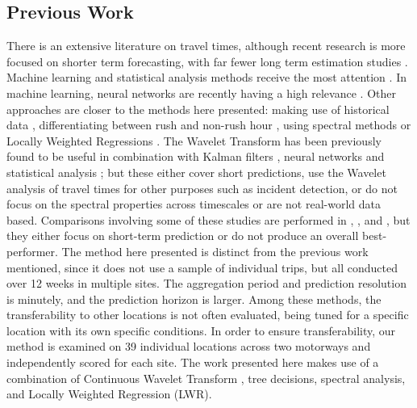 \documentclass[a4paper, 10pt, conference]{ieeeconf}      %
\begin{document}
\subsection{Previous Work} \label{Previous Work}
There is an extensive literature on travel times, although recent research is more focused on shorter term forecasting, with far fewer long term estimation studies \cite{long-term} \cite{long-term-2}. 
Machine learning and statistical analysis methods receive the most attention \cite{should}. 
In machine learning, neural networks are recently having a high relevance \cite{NN} \cite{spectral2}.
Other approaches are closer to the methods here presented: making use of historical data \cite{simple} \cite{dynamic-historic}, differentiating between rush and non-rush hour \cite{peak-historic}, using spectral methods \cite{spectral1} or Locally Weighted Regressions \cite{williams} \cite{sun} \cite{zhong} \cite{chowdhury} \cite{acqua} \cite{vana}.
The Wavelet Transform has been previously found to be useful in combination with Kalman filters \cite{nonlinear}, neural networks \cite{samant} \cite{ghosh} \cite{hojjat} \cite{adeli} and statistical analysis \cite{basu} \cite{hang}; but these either cover short predictions, use the Wavelet analysis of travel times for other purposes such as incident detection, or do not focus on the spectral properties across timescales or are not real-world data based.
Comparisons involving some of these studies are performed in \cite{nikovski}, \cite{lint}, \cite{mori} and \cite{ser}, but they either focus on short-term prediction or do not produce an overall best-performer.
The method here presented is distinct from the previous work mentioned, since it does not use a sample of individual trips, but all conducted over 12 weeks in multiple sites. 
The aggregation period and prediction resolution is minutely, and the prediction horizon is larger.
Among these methods, the transferability to other locations is not often evaluated, being tuned for a specific location with its own specific conditions.
In order to ensure transferability, our method is examined on 39 individual locations across two motorways and independently scored for each site.
The work presented here makes use of a combination of Continuous Wavelet Transform \cite{morletwavelet}, tree decisions, spectral analysis, and Locally Weighted Regression (LWR).
\end{document}
